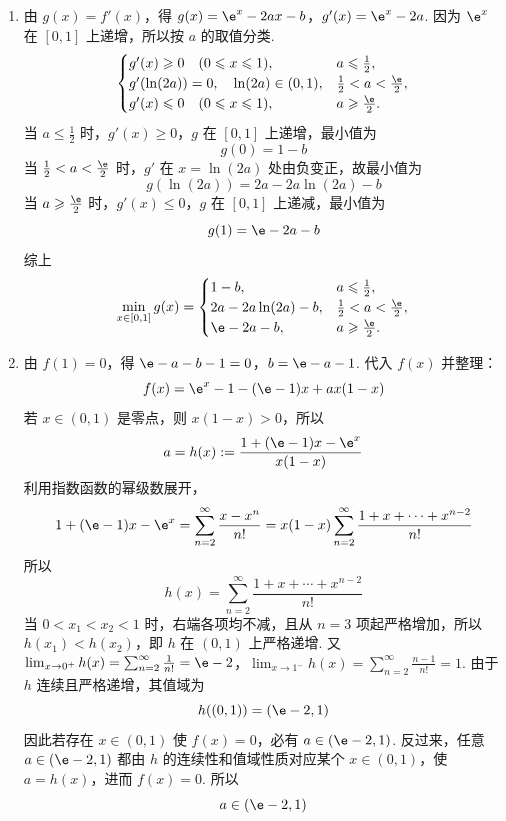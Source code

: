 \begin{solution}
\begin{enumerate}
\item 由 \(g(x)=f'(x)\)，得
\(g(x)=\e^x-2ax-b\)，\(g'(x)=\e^x-2a\).
因为 \(\e^x\) 在 \([0,1]\) 上递增，所以按 \(a\) 的取值分类.
\[
\begin{cases}
g'(x)\geqslant0\quad(0\leqslant x\leqslant1),&a\leqslant\frac12,\\
g'(\ln(2a))=0,\quad \ln(2a)\in(0,1),&\frac12<a<\frac\e2,\\
g'(x)\leqslant0\quad(0\leqslant x\leqslant1),&a\geqslant\frac\e2.
\end{cases}
\]
当 \(a\leqslant\frac12\) 时，\(g'(x)\geqslant0\)，\(g\) 在 \([0,1]\) 上递增，最小值为
\[
g(0)=1-b
\]
当 \(\frac12<a<\frac\e2\) 时，\(g'\) 在 \(x=\ln(2a)\) 处由负变正，故最小值为
\[
g(\ln(2a))=2a-2a\ln(2a)-b
\]
当 \(a\geqslant\frac\e2\) 时，\(g'(x)\leqslant0\)，\(g\) 在 \([0,1]\) 上递减，最小值为
\[
g(1)=\e-2a-b
\]
综上
\[
\min_{x\in[0,1]}g(x)=
\begin{cases}
1-b,&a\leqslant\frac12,\\
2a-2a\ln(2a)-b,&\frac12<a<\frac\e2,\\
\e-2a-b,&a\geqslant\frac\e2.
\end{cases}
\]

\item 由 \(f(1)=0\)，得
\(\e-a-b-1=0\)，\(b=\e-a-1\).
代入 \(f(x)\) 并整理：
\[
f(x)=\e^x-1-(\e-1)x+a x(1-x)
\]
若 \(x\in(0,1)\) 是零点，则 \(x(1-x)>0\)，所以
\[
a=h(x):=\frac{1+(\e-1)x-\e^x}{x(1-x)}
\]
利用指数函数的幂级数展开，
\[
1+(\e-1)x-\e^x=\sum_{n=2}^{\infty}\frac{x-x^n}{n!}
=x(1-x)\sum_{n=2}^{\infty}\frac{1+x+\cdots+x^{n-2}}{n!}
\]
所以
\[
h(x)=\sum_{n=2}^{\infty}\frac{1+x+\cdots+x^{n-2}}{n!}
\]
当 \(0<x_1<x_2<1\) 时，右端各项均不减，且从 \(n=3\) 项起严格增加，所以 \(h(x_1)<h(x_2)\)，即 \(h\) 在 \((0,1)\) 上严格递增. 又
\(\lim_{x\to0^+}h(x)=\sum_{n=2}^{\infty}\frac1{n!}=\e-2\)，\(\lim_{x\to1^-}h(x)=\sum_{n=2}^{\infty}\frac{n-1}{n!}=1\).
由于 \(h\) 连续且严格递增，其值域为
\[
h((0,1))=(\e-2,1)
\]
因此若存在 \(x\in(0,1)\) 使 \(f(x)=0\)，必有 \(a\in(\e-2,1)\). 反过来，任意 \(a\in(\e-2,1)\) 都由 \(h\) 的连续性和值域性质对应某个 \(x\in(0,1)\)，使 \(a=h(x)\)，进而 \(f(x)=0\). 所以
\[
a\in(\e-2,1)
\]
\end{enumerate}
\end{solution}
